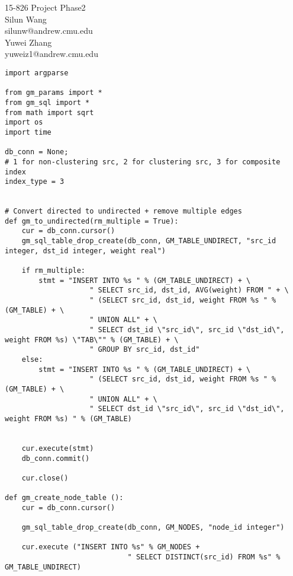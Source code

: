 \documentclass[11pt]{article}
\makeatletter
\newcommand{\name}{Silun Wang}
\newcommand{\andrew}{silunw@andrew.cmu.edu}
\newcommand{\myname}{Yuwei Zhang}
\newcommand{\myandrew}{yuweiz1@andrew.cmu.edu}
\makeatother
\begin{document}
\medskip                        %

\thispagestyle{plain}
\begin{center}                  %
{\Large 15-826 Project Phase2} \\[10pt]
\name \\
\andrew \\
\myname \\
\myandrew \\

\end{center}
\begin{lstlisting}
import argparse

from gm_params import *
from gm_sql import *
from math import sqrt
import os
import time

db_conn = None;
# 1 for non-clustering src, 2 for clustering src, 3 for composite index
index_type = 3


# Convert directed to undirected + remove multiple edges
def gm_to_undirected(rm_multiple = True):
    cur = db_conn.cursor()
    gm_sql_table_drop_create(db_conn, GM_TABLE_UNDIRECT, "src_id integer, dst_id integer, weight real")
    
    if rm_multiple: 
        stmt = "INSERT INTO %s " % (GM_TABLE_UNDIRECT) + \
                    " SELECT src_id, dst_id, AVG(weight) FROM " + \
                    " (SELECT src_id, dst_id, weight FROM %s " % (GM_TABLE) + \
                    " UNION ALL" + \
                    " SELECT dst_id \"src_id\", src_id \"dst_id\", weight FROM %s) \"TAB\"" % (GM_TABLE) + \
                    " GROUP BY src_id, dst_id"
    else:
        stmt = "INSERT INTO %s " % (GM_TABLE_UNDIRECT) + \
                    " (SELECT src_id, dst_id, weight FROM %s " % (GM_TABLE) + \
                    " UNION ALL" + \
                    " SELECT dst_id \"src_id\", src_id \"dst_id\", weight FROM %s) " % (GM_TABLE) 
                    
                
    cur.execute(stmt)
    db_conn.commit()

    cur.close()    
    
def gm_create_node_table ():
    cur = db_conn.cursor()

    gm_sql_table_drop_create(db_conn, GM_NODES, "node_id integer")
    
    cur.execute ("INSERT INTO %s" % GM_NODES +
                             " SELECT DISTINCT(src_id) FROM %s" % GM_TABLE_UNDIRECT)
                                                              

\end{lstlisting}
\end{document}
